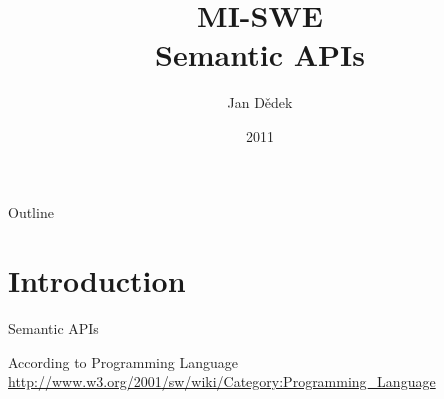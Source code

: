 \documentclass[xcolor=dvipsnames]{beamer}
\title{MI-SWE\\Semantic APIs}
\author{Jan Dědek}
\institute{FIT-ČVUT}
\date{2011}
\begin{document}

\begin{frame}
  \titlepage
\end{frame}

\begin{frame}{Outline}
  \tableofcontents
\end{frame}


\section{Introduction} 

\begin{frame}{Semantic APIs}
\begin{block}{According to Programming Language}
\medskip
\scriptsize\url{http://www.w3.org/2001/sw/wiki/Category:Programming_Language}
\medskip
\end{block}
\end{frame}
\end{document}
